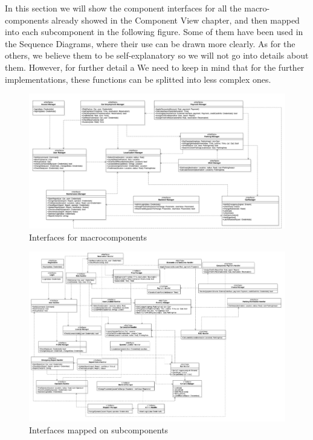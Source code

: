 	In this section we will show the component interfaces for all the macro-components already showed in the Component View chapter, and then mapped into each subcomponent in the following figure. Some of them have been used in the Sequence Diagrams, where their use can be drawn more clearly. As for the others, we believe them to be self-explanatory so we will not go into details about them. However, for further detail a  We need to keep in mind that for the further implementations, these functions can be splitted into less complex ones.  
		\begin{figure}
			\includegraphics[width=\hsize, center]{img/Interfaces_new.png}
			\caption{Interfaces for macrocomponents}
		\end{figure}

		\begin{figure}
			\includegraphics[width=\hsize, center]{img/Interfaces_mapped_on_subcomponents.png}
			\caption{Interfaces mapped on subcomponents}
		\end{figure}